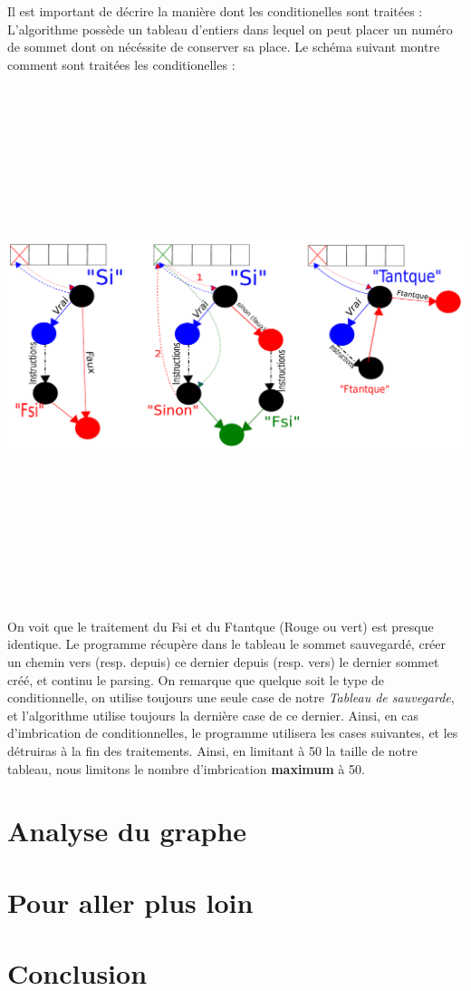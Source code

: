 \documentclass[a4paper,11pt]{article}
\begin{document}
		Il est important de décrire la manière dont les conditionelles sont traitées :\\
		L'algorithme possède un tableau d'entiers dans lequel on peut placer un numéro de sommet dont on nécéssite de conserver sa place. Le schéma suivant montre comment sont traitées les conditionelles :
		\begin{center}\includegraphics[width=15cm,height=15cm]{dessin.pdf}\end{center}
	On voit que le traitement du Fsi et du Ftantque (Rouge ou vert) est presque identique. Le programme récupère dans le tableau le sommet sauvegardé, créer un chemin vers (resp. depuis) ce dernier depuis (resp. vers) le dernier sommet créé, et continu le parsing. On remarque que quelque soit le type de conditionnelle, on utilise toujours une seule case de notre \textit{Tableau de sauvegarde}, et l'algorithme utilise toujours la dernière case de ce dernier. Ainsi, en cas d'imbrication de conditionnelles, le programme utilisera les cases suivantes, et les détruiras à la fin des traitements. Ainsi, en limitant à 50 la taille de notre tableau, nous limitons le nombre d'imbrication \textbf{maximum} à 50.
	\section{Analyse du graphe}
	\section{Pour aller plus loin}
	\section{Conclusion}
\end{document}
